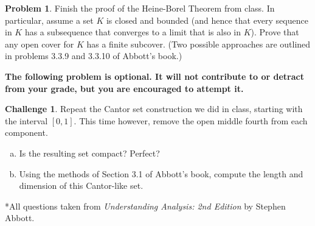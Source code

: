 \documentclass{amsart}
\newcommand{\+}[1]{\ensuremath{\mathbf{#1}}}
\theoremstyle{definition}
\newtheorem{prob}{Problem}
\newtheorem{chal}{Challenge}
\begin{document}
\begin{prob}
 Finish the proof of the Heine-Borel Theorem from class.
 In particular, assume a set $K$ is closed and bounded
 (and hence that every sequence in $K$ has a subsequence
 that converges to a limit that is also in $K$).
 Prove that any open cover for $K$ has a finite subcover.
 (Two possible approaches are outlined in problems 
 3.3.9 and 3.3.10 of Abbott's book.)
\end{prob}



\vspace{5mm}

{\bf The following problem is optional.  It
will not contribute to or detract from your grade, but you are encouraged
to attempt it.}

\vspace{5mm}

\begin{chal}
 Repeat the Cantor set construction we did in class, starting
 with the interval $[0,1]$.  This time however,
 remove the open middle fourth from each component.
 \begin{enumerate}[(a)]
  \item Is the resulting set compact? Perfect?
  \item Using the methods of Section 3.1 of Abbott's book,
  compute the length and dimension of this
  Cantor-like set.
 \end{enumerate}
\end{chal}


\vspace{5mm}

*All questions taken from \emph{Understanding Analysis: 2nd Edition} by Stephen Abbott.
\end{document}
